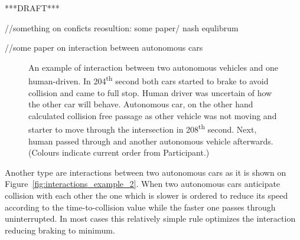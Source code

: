 \documentclass[11pt,english]{article}
\begin{document}
***DRAFT***

//something on conficts reosultion: some paper/ nash equlibrum


//some paper on interaction between autonomous cars



\begin{figure}[!] %
\caption{An example of interaction between two autonomous vehicles and one human-driven. In 204\textsuperscript{th} second both cars started to brake to avoid collision and came to full stop. Human driver was uncertain of how the other car will behave. Autonomous car, on the other hand calculated collision free passage as other vehicle was not moving and starter to move through the intersection in 208\textsuperscript{th} second. Next, human passed through and another autonomous vehicle afterwards. (Colours indicate current order from Participant.)}
\label{fig:interactions_example_1v2}
\end{figure}

Another type are interactions between two autonomous cars as it is shown on Figure~\ref{fig:interactions_example_2}. When two autonomous cars anticipate collision with each other the one which is slower is ordered to reduce its speed according to the time-to-collision value while the faster one passes through uninterrupted. In most cases this relatively simple rule optimizes the interaction reducing braking to minimum.  




\end{document}
